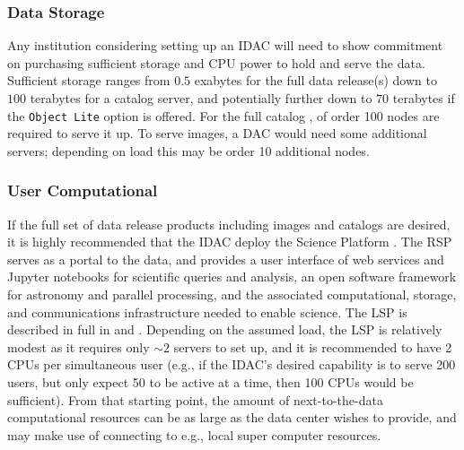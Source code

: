 \subsubsection{Data Storage}
Any institution considering setting up an \gls{IDAC} will need to show commitment on purchasing sufficient storage and \gls{CPU} power to hold and serve the data. Sufficient storage ranges from $0.5$ exabytes for the full data release(s) down to $100$ terabytes for a catalog server, and potentially further down to $70$ terabytes if the {\tt Object Lite} option is offered. For the full catalog , of order 100 nodes are required to serve it up. To serve images, a \gls{DAC} would need some additional servers; depending on load this may be order 10 additional nodes.

\subsubsection{User Computational}
If the full set of data release products including images and catalogs are desired, it is highly recommended that the \gls{IDAC} deploy the \RO \gls{Science Platform} . The \gls{RSP} serves as a portal to the data, and provides a user interface of web services and Jupyter notebooks for scientific queries and analysis, an open software framework for astronomy and parallel processing, and the associated computational, storage, and communications infrastructure needed to enable science. The \gls{LSP} is described in full in  and . Depending on the assumed load, the \gls{LSP} is relatively modest as it requires only $\sim2$ servers to set up, and it is recommended to have 2 CPUs per simultaneous user (e.g., if the \gls{IDAC}'s desired capability is to serve 200 users, but only expect 50 to be active at a time, then 100 CPUs would be sufficient). From that starting point, the amount of next-to-the-data computational resources can be as large as the data center wishes to provide, and may make use of connecting to e.g., local super computer resources.

